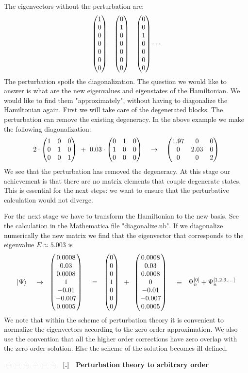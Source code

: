 \documentclass[onecolumn,fleqn]{revtex4}
\newcommand{\amatrix}[1]{\begin{matrix} #1 \end{matrix}}
\newcommand{\beq}{\begin{eqnarray}}
\newcommand{\eeq}{\end{eqnarray}}
\renewcommand{\thesubsection}{\arabic{subsection}}
\renewcommand{\thesubsubsection}{\arabic{subsubsection}}
\newcommand{\sheadC}[1]
{
\addtocounter{subsubsection}{1}
\vspace{5mm}
{\Large\bf $=\!=\!=\!=\!=\!=\;$ [\thesubsection.\thesubsubsection] \ #1}  
\nopagebreak
\phantomsection
}
\begin{document}
The eigenvectors without the perturbation are:
\beq
\left(\amatrix{ 1 \cr 0 \cr 0 \cr 0 \cr 0 \cr 0 \cr 0} \right)\,\,\,\,\, 
\left(\amatrix{ 0 \cr 1 \cr 0 \cr 0 \cr 0 \cr 0 \cr 0} \right) \,\,\,\,\, 
\left(\amatrix{ 0 \cr 0 \cr 1 \cr 0 \cr 0 \cr 0 \cr 0} \right) \cdots 
\eeq
The perturbation spoils the diagonalization. The question we 
would like to answer is what are the new eigenvalues and 
eigenstates of the Hamiltonian. We would like to find them "approximately", 
without having to diagonalize the Hamiltonian again. First 
we will take care of the degenerated blocks. The perturbation 
can remove the existing degeneracy. In the above example we 
make the following diagonalization:
\beq
2 \cdot 
\left(
\amatrix{ 
1 & 0 & 0 \cr 
0 & 1 & 0 \cr 
0 & 0 & 1 } 
\right) 
\,\,+ \,\, 
0.03 \cdot 
\left(
\amatrix{ 
0 & 1 & 0 \cr
1 & 0 & 0 \cr 
0 & 0 & 0 } 
\right) 
\ \ \ \rightarrow \ \ \ 
\left(
\amatrix{ 
1.97 & 0 & 0 \cr 
0 & 2.03 & 0 \cr 
0 & 0 & 2 } 
\right)
\eeq
We see that the perturbation 
has removed the degeneracy. 
At this stage our achievement is that there 
are no matrix elements that couple degenerate states. 
This is essential for the next steps:  
we want to ensure that the perturbative calculation 
would not diverge. 

For the next stage we have to transform the Hamiltonian 
to the new basis. See the calculation in the Mathematica 
file "diagonalize.nb". If we diagonalize numerically 
the new matrix we find that the eigenvector that 
corresponds to the eigenvalue $E \approx 5.003$ is 
\beq
|\Psi\rangle  
\,\,\,\,\,\,\,\rightarrow\,\,\,\, 
\left(\amatrix{ 0.0008 \cr 0.03 \cr 0.0008 \cr 1 \cr -0.01 \cr -0.007 \cr 0.0005 } \right) 
\,\,\,\,\,\,\,= \,\,\,\, 
\left(\amatrix{ 0 \cr 0 \cr 0 \cr 1 \cr 0 \cr 0 \cr 0 } \right) 
\,\,\,+ \,\,\, 
\left(\amatrix{ 0.0008 \cr 0.03 \cr 0.0008 \cr 0 \cr -0.01 \cr -0.007 \cr 0.0005 } \right) 
\,\,\,\,\,\,\, \equiv \,\,\,\, 
\Psi_n^{[0]}+ \Psi_n^{[1,2,3, \dots ]} 
\eeq
We note that within the scheme of perturbation theory  
it is convenient to normalize the eigenvectors according 
to the zero order approximation. We also use the convention 
that all the higher order corrections have zero overlap 
with the zero order solution. Else the scheme of 
the solution becomes ill defined.        



\sheadC{Perturbation theory to arbitrary order} 
\end{document}
